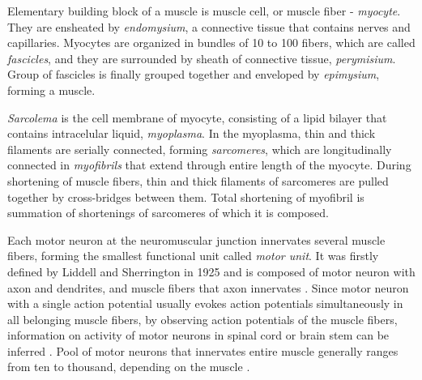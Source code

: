 Elementary building block of a muscle is muscle cell, or muscle fiber - \emph{myocyte}. They are ensheated by \emph{endomysium}, a connective tissue that contains nerves and capillaries. Myocytes are organized in bundles of 10 to 100 fibers, which are called \emph{fascicles}, and they are surrounded by sheath of connective tissue, \emph{perymisium}. Group of fascicles is finally grouped together and enveloped by \emph{epimysium}, forming a muscle.

\emph{Sarcolema} is the cell membrane of myocyte, consisting of a lipid bilayer that contains intracelular liquid, \emph{myoplasma}. In the myoplasma, thin and thick filaments are serially connected, forming \emph{sarcomeres}, which are longitudinally connected in \emph{myofibrils} that extend through entire length of the myocyte. During shortening of muscle fibers, thin and thick filaments of sarcomeres are pulled together by cross-bridges between them. Total shortening of myofibril is summation of shortenings of sarcomeres of which it is composed.

Each motor neuron at the neuromuscular junction innervates several muscle fibers, forming the smallest functional unit called \emph{motor unit}. It was firstly defined by Liddell and Sherrington in 1925 \citep{Liddell1925, Sherrington1925} and is composed of motor neuron with axon and dendrites, and muscle fibers that axon innervates \citep{Duchateau2011}. Since motor neuron with a single action potential usually evokes action potentials simultaneously in all belonging muscle fibers, by observing action potentials of the muscle fibers, information on activity of motor neurons in spinal cord or brain stem can be inferred \citep{Merletti-Farina-book}. Pool of motor neurons that innervates entire muscle generally ranges from ten to thousand, depending on the muscle \citep{Merletti-Farina-book}.

